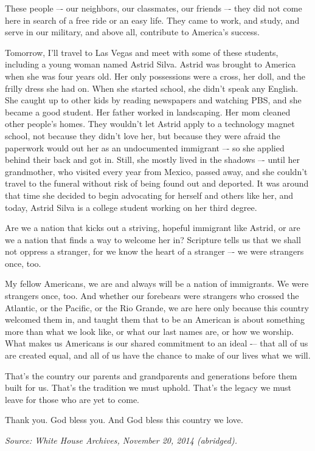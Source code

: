 \documentclass[10pt,a4paper]{article}
\begin{document}
These people –- our neighbors, our classmates, our friends –- they did not come here in search of a free ride or an easy life. They came to work, and study, and serve in our military, and above all, contribute to America’s success.

Tomorrow, I’ll travel to Las Vegas and meet with some of these students, including a young woman named Astrid Silva. Astrid was brought to America when she was four years old. Her only possessions were a cross, her doll, and the frilly dress she had on. When she started school, she didn’t speak any English. She caught up to other kids by reading newspapers and watching PBS, and she became a good student. Her father worked in landscaping. Her mom cleaned other people’s homes. They wouldn’t let Astrid apply to a technology magnet school, not because they didn’t love her, but because they were afraid the paperwork would out her as an undocumented immigrant –- so she applied behind their back and got in. Still, she mostly lived in the shadows –- until her grandmother, who visited every year from Mexico, passed away, and she couldn’t travel to the funeral without risk of being found out and deported. It was around that time she decided to begin advocating for herself and others like her, and today, Astrid Silva is a college student working on her third degree.

Are we a nation that kicks out a striving, hopeful immigrant like Astrid, or are we a nation that finds a way to welcome her in? Scripture tells us that we shall not oppress a stranger, for we know the heart of a stranger –- we were strangers once, too.

My fellow Americans, we are and always will be a nation of immigrants. We were strangers once, too. And whether our forebears were strangers who crossed the Atlantic, or the Pacific, or the Rio Grande, we are here only because this country welcomed them in, and taught them that to be an American is about something more than what we look like, or what our last names are, or how we worship. What makes us Americans is our shared commitment to an ideal -– that all of us are created equal, and all of us have the chance to make of our lives what we will.

That’s the country our parents and grandparents and generations before them built for us. That’s the tradition we must uphold. That’s the legacy we must leave for those who are yet to come.

Thank you. God bless you. And God bless this country we love.

\bigskip
\noindent\textit{Source: White House Archives, November 20, 2014 (abridged).}
\end{document}
